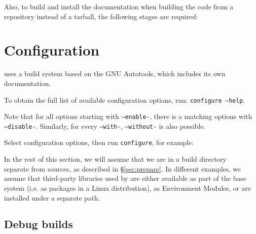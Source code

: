 \documentclass[a4paper,10pt,twoside]{csshortdoc}
\begin{document}
Also, to build and install the documentation when building the code
from a repository instead of a tarball, the following stages are required:


\section{Configuration\label{sec:config}}

\CS uses a build system based on the GNU Autotools, which includes
its own documentation.

To obtain the full list of available configuration options,
run: {\tt configure~--help}.

Note that for all options starting with {\tt --enable-},
there is a matching options with {\tt --disable-}. Similarly,
for every {\tt --with-}, {\tt --without-} is also possible.

Select configuration options, then run {\tt configure}, for example:


In the rest of this section, we will assume that we are in
a build directory separate from sources, as described in
\S\ref{sec:prepare}. In different examples, we assume
that third-party libraries used by \CS are either available
as part of the base system (i.e. as packages in a Linux distribution),
as Environment Modules, or are installed under a separate path.

\subsection{Debug builds\label{sec:config:shared}}
\end{document}
